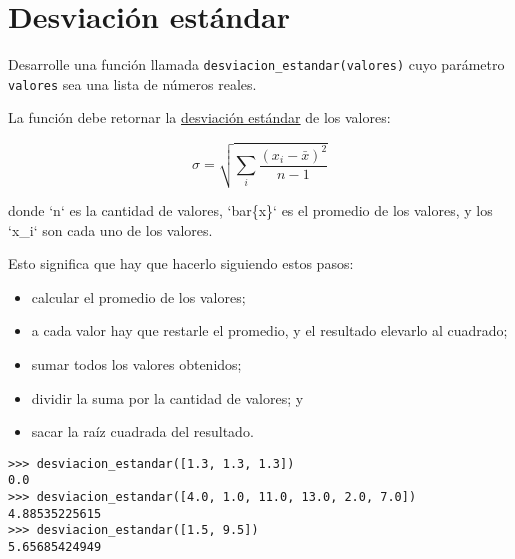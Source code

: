 \section{Desviación estándar}

Desarrolle una función llamada \lstinline!desviacion_estandar(valores)!
cuyo parámetro \lstinline!valores! sea una lista de números reales.

La función debe retornar la
\href{http://es.wikipedia.org/wiki/Desviaci\%C3\%B3n\_est\%C3\%A1ndar}{desviación
estándar} de los valores:

\[\sigma = \sqrt{\sum_{i} \frac{(x_i - \bar{x})^2}{n - 1}}\]

donde `n` es la cantidad de valores, `bar\{x\}` es el promedio de los
valores, y los `x\_i` son cada uno de los valores.

Esto significa que hay que hacerlo siguiendo estos pasos:

\begin{itemize}
\item
  calcular el promedio de los valores;
\item
  a cada valor hay que restarle el promedio, y el resultado elevarlo al
  cuadrado;
\item
  sumar todos los valores obtenidos;
\item
  dividir la suma por la cantidad de valores; y
\item
  sacar la raíz cuadrada del resultado.
\end{itemize}

\begin{lstlisting}
>>> desviacion_estandar([1.3, 1.3, 1.3])
0.0
>>> desviacion_estandar([4.0, 1.0, 11.0, 13.0, 2.0, 7.0])
4.88535225615
>>> desviacion_estandar([1.5, 9.5])
5.65685424949
\end{lstlisting}

